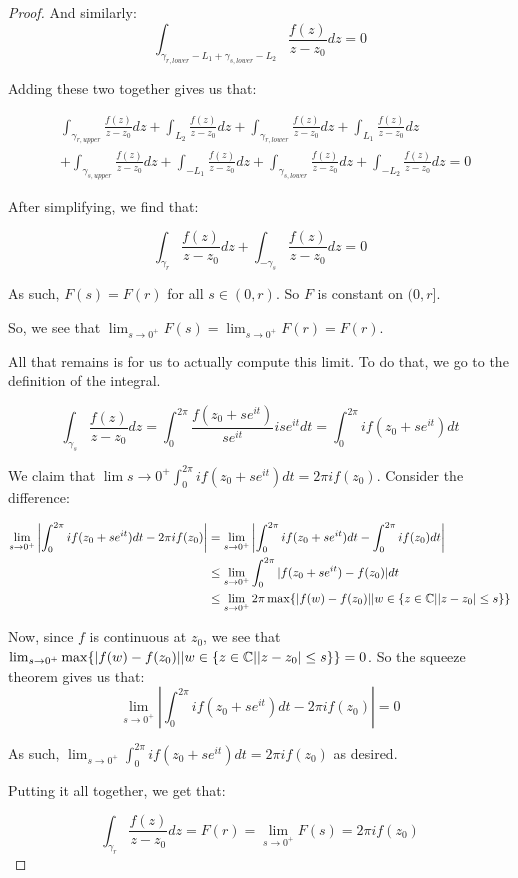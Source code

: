 \begin{proof}
And similarly:
$$\int_{\gamma_{r,lower} - L_1 + \gamma_{s,lower} - L_2} \frac{f(z)}{z-z_0}dz = 0$$

Adding these two together gives us that:

\begin{align*}&\int_{\gamma_{r,upper}} \frac{f(z)}{z-z_0} dz + \int_{L_2} \frac{f(z)}{z-z_0} dz + \int_{\gamma_{r,lower}} \frac{f(z)}{z-z_0} dz + \int_{L_1} \frac{f(z)}{z-z_0} dz \\
&+\int_{\gamma_{s,upper}} \frac{f(z)}{z-z_0} dz + \int_{-L_1} \frac{f(z)}{z-z_0} dz + \int_{\gamma_{s,lower}} \frac{f(z)}{z-z_0} dz + \int_{-L_2} \frac{f(z)}{z-z_0} dz  = 0\end{align*}

After simplifying, we find that:

$$\int_{\gamma_{r}} \frac{f(z)}{z-z_0} dz + \int_{-\gamma_{s}} \frac{f(z)}{z-z_0}dz = 0$$

As such, $F(s) = F(r)$ for all $s \in (0,r)$. So $F$ is constant on $(0,r]$.

So, we see that $\lim_{s\rightarrow 0^+} F(s) = \lim_{s\rightarrow 0^+}F(r) = F(r)$.

All that remains is for us to actually compute this limit. To do that, we go to the definition of the integral.

$$\int_{\gamma_s} \frac{f(z)}{z-z_0}dz = \int_0^{2\pi} \frac{f(z_0 + se^{it})}{se^{it}}ise^{it}dt = \int_0^{2\pi} if(z_0 + se^{it})dt$$

We claim that $\lim{s\rightarrow 0^+} \int_0^{2\pi} if(z_0 + se^{it})dt =2\pi i f(z_0)$. Consider the difference:

\begin{align*}\lim_{s\rightarrow 0^+} \left|\int_0^{2\pi} if(z_0 + se^{it})dt - 2\pi i f(z_0)\right| &= \lim_{s\rightarrow 0^+} \left|\int_0^{2\pi} if(z_0 + se^{it})dt - \int_0^{2\pi} if(z_0)dt\right|\\
&\le \lim_{s\rightarrow 0^+} \int_0^{2\pi} |f(z_0 + se^{it}) - f(z_0)|dt\\
&\le \lim_{s\rightarrow 0^+} 2\pi \max\{|f(w) - f(z_0)|| w\in \{z\in\mathbb{C}||z-z_0|\le s\}\}
\end{align*}

Now, since $f$ is continuous at $z_0$, we see that  $\lim_{s\rightarrow 0^+}\max\{|f(w) - f(z_0)|| w\in \{z\in\mathbb{C}||z-z_0|\le s\}\} = 0$. So the squeeze theorem gives us that:
$$\lim_{s\rightarrow 0^+} \left|\int_0^{2\pi} if(z_0 + se^{it})dt - 2\pi i f(z_0)\right| = 0$$

As such, $\lim_{s\rightarrow 0^+} \int_0^{2\pi} if(z_0 + se^{it})dt =2\pi i f(z_0)$ as desired.

Putting it all together, we get that:

$$\int_{\gamma_r} \frac{f(z)}{z-z_0}dz = F(r) = \lim_{s\rightarrow 0^+} F(s) = 2\pi i f(z_0)$$

\end{proof}

